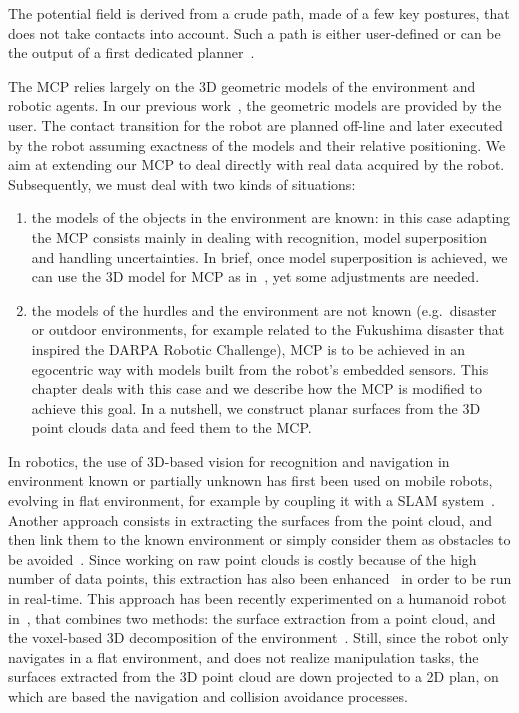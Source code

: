 The potential field is derived from a crude path, made of a few key postures, that does not take contacts into account.
Such a path is either user-defined or can be the output of a first dedicated planner~\cite{bouyarmane:icra:2009}.

The MCP relies largely on the 3D geometric models of the environment and robotic agents.
In our previous work~\cite{escande:ras:2013,bouyarmane:ar:2012}, the geometric models are provided by the user.
The contact transition for the robot are planned off-line and later executed by the robot assuming exactness of the models and their relative positioning.
We aim at extending our MCP to deal directly with real data acquired by the robot.
Subsequently, we must deal with two kinds of situations:
\begin{enumerate}
  \item the models of the objects in the environment are known: in this case adapting the MCP consists mainly in dealing with recognition, model superposition and handling uncertainties.
  In brief, once model superposition is achieved, we can use the 3D model for MCP as in~\cite{escande:ras:2013,bouyarmane:ar:2012}, yet some adjustments are needed.
  \item the models of the hurdles and the environment are not known (e.g.\ disaster or outdoor environments, for example related to the Fukushima disaster that inspired the DARPA Robotic Challenge), MCP is to be achieved in an egocentric way with models built from the robot's embedded sensors.
  This chapter deals with this case and we describe how the MCP is modified to achieve this goal.
  In a nutshell, we construct planar surfaces from the 3D point clouds data and feed them to the MCP.\@
\end{enumerate}

In robotics, the use of 3D-based vision for recognition and navigation in environment known or partially unknown has first been used on mobile robots, evolving in flat environment, for example by coupling it with a SLAM system~\cite{whitty:acra:2012}.
Another approach consists in extracting the surfaces from the point cloud, and then link them to the known environment or simply consider them as obstacles to be avoided~\cite{poppinga:iros:2008}.
Since working on raw point clouds is costly because of the high number of data points, this extraction has also been enhanced~\cite{biswas:icra:2012} in order to be run in real-time.
This approach has been recently experimented on a humanoid robot in~\cite{maier:humanoids:2012}, that combines two methods: the surface extraction from a point cloud, and the voxel-based 3D decomposition of the environment~\cite{nakhaei:humanoids:2008}.
Still, since the robot only navigates in a flat environment, and does not realize manipulation tasks, the surfaces extracted from the 3D point cloud are down projected to a 2D plan, on which are based the navigation and collision avoidance processes.

